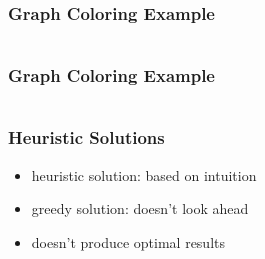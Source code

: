 \documentclass[dvipsnames]{beamer}
\begin{document}
\begin{frame}
  \frametitle{Graph Coloring Example}

  \begin{columns}
    \begin{center}
    \end{center}

    \begin{center}
    \end{center}
  \end{columns}
\end{frame}

\begin{frame}
  \frametitle{Graph Coloring Example}

  \begin{columns}
    \begin{center}
    \end{center}

    \begin{center}
    \end{center}
  \end{columns}
\end{frame}

\begin{frame}
  \frametitle{Heuristic Solutions}

  \begin{itemize}
    \item \alert{heuristic} solution: based on intuition

    \medskip
    \item \alert{greedy} solution: doesn't look ahead
    \item doesn't produce optimal results
  \end{itemize}
\end{frame}
\end{document}
